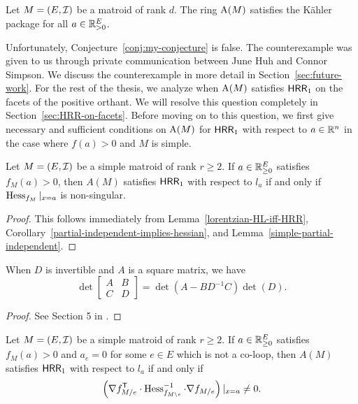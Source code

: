 \documentclass{puthesis-UG}
\begin{document}
\begin{conj} \label{conj:my-conjecture}
	Let $M = (E, \mathcal{I})$ be a matroid of rank $d$. The ring $\operatorname{A}(M)$ satisfies the K\"ahler package for all $a \in \mathbb{R}^E_{> 0}$.
\end{conj}

Unfortunately, Conjecture~\ref{conj:my-conjecture} is false. The counterexample was given to us through private communication between June Huh and Connor Simpson. We discuss the counterexample in more detail in Section~\ref{sec:future-work}. For the rest of the thesis, we analyze when $\operatorname{A}(M)$ satisfies $\mathsf{HRR}_1$ on the facets of the positive orthant. We will resolve this question completely in Section~\ref{sec:HRR-on-facets}. Before moving on to this question, we first give necessary and sufficient conditions on $\operatorname{A}(M)$ for $\mathsf{HRR}_1$ with respect to $a \in \mathbb{R}^n$ in the case where $f(a) > 0$ and $M$ is simple.

\begin{cor} \label{simple-matroids-HRR-condition}
	Let $M = (E, \mathcal{I})$ be a simple matroid of rank $r \geq 2$. If $a \in \mathbb{R}_{\geq 0}^E$ satisfies $f_M(a) > 0$, then $A(M)$ satisfies $\mathsf{HRR}_1$ with respect to $l_a$ if and only if $\operatorname{Hess}_{f_M} |_{x = a}$ is non-singular.
\end{cor} 

\begin{proof}
	This follows immediately from Lemma~\ref{lorentzian-HL-iff-HRR}, Corollary~\ref{partial-independent-implies-hessian}, and Lemma~\ref{simple-partial-independent}.
\end{proof}

\begin{lem} \label{block-matrix-determinant-calculation}
		When $D$ is invertible and $A$ is a square matrix, we have
		\[
			\det \begin{bmatrix} A & B \\ C & D \end{bmatrix} = \det (A - B D^{-1} C) \det (D).
		\]
	\end{lem}
	\begin{proof}
		See Section 5 in \cite{block-matrices}.
	\end{proof}

\begin{thm} \label{thm:simple-inverse-hessian-property}
	Let $M = (E, \mathcal{I})$ be a simple matroid of rank $r \geq 2$. If $a \in \mathbb{R}_{\geq 0}^E$ satisfies $f_M(a) > 0$ and $a_e = 0$ for some $e \in E$ which is not a co-loop, then $A(M)$ satisfies $\mathsf{HRR}_1$ with respect to $l_a$ if and only if 
	\[
		\left ( \nabla f_{M / e}^{\mathsf{T}} \cdot \operatorname{Hess}^{-1}_{f_{M \backslash e}} \cdot \nabla f_{M / e} \right ) |_{x = a} \neq 0.
	\]
\end{thm}
\end{document}
